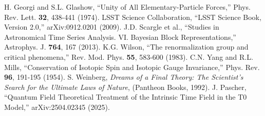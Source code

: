 \documentclass[twocolumn,aps,prl]{revtex4-2}
\begin{document}
\begin{thebibliography}{99}
		 H. Georgi and S.L. Glashow, ``Unity of All Elementary-Particle Forces,'' Phys. Rev. Lett. \textbf{32}, 438-441 (1974).
		 LSST Science Collaboration, ``LSST Science Book, Version 2.0,'' arXiv:0912.0201 (2009).
		 J.D. Scargle et al., ``Studies in Astronomical Time Series Analysis. VI. Bayesian Block Representations,'' Astrophys. J. \textbf{764}, 167 (2013).
		 K.G. Wilson, ``The renormalization group and critical phenomena,'' Rev. Mod. Phys. \textbf{55}, 583-600 (1983).
		 C.N. Yang and R.L. Mills, ``Conservation of Isotopic Spin and Isotopic Gauge Invariance,'' Phys. Rev. \textbf{96}, 191-195 (1954).
		 S. Weinberg, \textit{Dreams of a Final Theory: The Scientist's Search for the Ultimate Laws of Nature}, (Pantheon Books, 1992).
		 J. Pascher, ``Quantum Field Theoretical Treatment of the Intrinsic Time Field in the T0 Model,'' arXiv:2504.02345 (2025).
	\end{thebibliography}	
\end{document}
